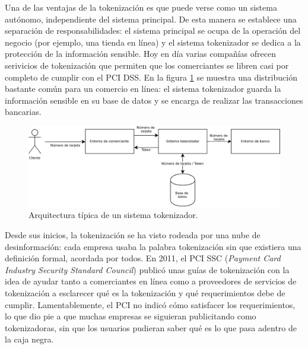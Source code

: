 Una de las ventajas de la tokenización es que puede verse como un sistema
autónomo, independiente del sistema principal. De esta manera se establece una
separación de responsabilidades: el sistema principal se ocupa de la operación
del negocio (por ejemplo, una tienda en línea) y el sistema tokenizador se
dedica a la protección de la información sensible. Hoy en día varias compañías
ofrecen serivicios de tokenización que permiten que los comerciantes se libren
casi por completo de cumplir con el PCI DSS. En la figura
\ref{figura:arquitectura_tokenizacion} se muestra una distribución bastante
común para un comercio en línea: el sistema tokenizador guarda la información
sensible en su base de datos y se encarga de realizar las transacciones
bancarias.

\begin{figure}
  \begin{center}
    \includegraphics[width=1.0\linewidth]
      {algoritmos_tokenizadores/diagramas/sistema_tokenizador.png}
    \caption{Arquitectura típica de un sistema tokenizador.}
    \label{figura:arquitectura_tokenizacion}
  \end{center}
\end{figure}


Desde sus inicios, la tokenización se ha visto rodeada por una nube de desinformación: cada empresa usaba la palabra tokenización sin que existiera una definición formal, acordada por todos. En 2011, el PCI SSC (\textit{Payment Card Industry Security Standard Council}) publicó unas guías de tokenización \cite{pci_tokens} con la idea de ayudar tanto a comerciantes en línea como a proveedores de servicios de tokenización a esclarecer qué es la tokenización y qué requerimientos debe de cumplir. Lamentablemente, el PCI no indicó cómo satisfacer los requerimientos, lo que dio pie a que muchas empresas se siguieran publicitando como tokenizadoras, sin que los usuarios pudieran saber qué es lo que pasa adentro de la caja negra.

